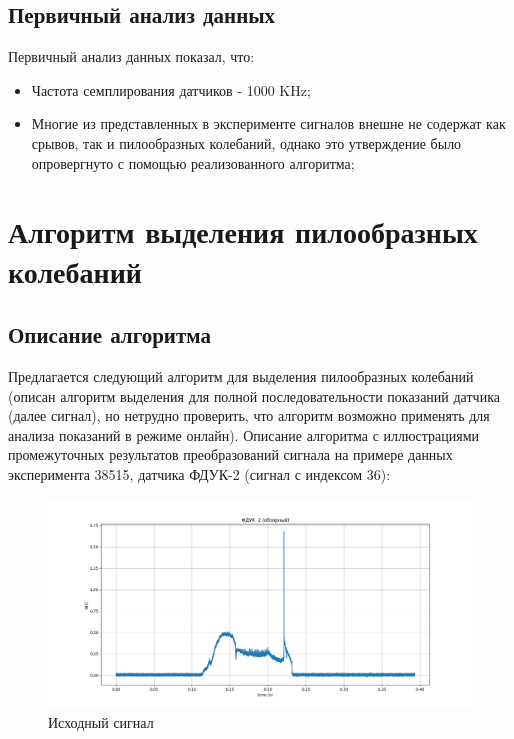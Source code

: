\documentclass[12pt,a4paper]{article}
\begin{document}
		\subsection{Первичный анализ данных}
			Первичный анализ данных показал, что:
			\begin{itemize}
				\item Частота семплирования датчиков - 1000 KHz;
				\item Многие из представленных в эксперименте сигналов внешне не содержат как срывов, так и пилообразных колебаний, однако это утверждение было опровергнуто с помощью реализованного алгоритма;
			\end{itemize}
	\newpage
	
	\section{Алгоритм выделения пилообразных колебаний}
		\subsection{Описание алгоритма}
			Предлагается следующий алгоритм для выделения пилообразных колебаний (описан алгоритм выделения для полной последовательности показаний датчика (далее сигнал), но нетрудно проверить, что алгоритм возможно применять для анализа показаний в режиме онлайн). Описание алгоритма с иллюстрациями промежуточных результатов преобразований сигнала на примере данных эксперимента 38515, датчика ФДУК-2 (сигнал с индексом 36):
			
			\FloatBarrier
			\begin{figure}[h!]
				\centering\includegraphics[width=1\linewidth]{./../plots/signal_raw.png}
				\caption{Исходный сигнал}
			\end{figure}
			\FloatBarrier
			
\end{document}

